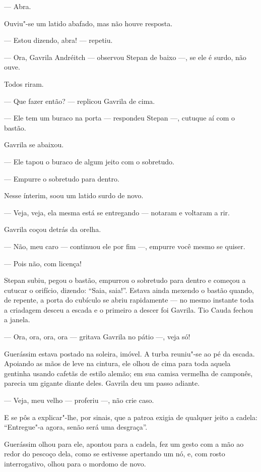 --- Abra.

Ouviu"-se um latido abafado, mas não houve resposta.

--- Estou dizendo, abra! --- repetiu.

--- Ora, Gavrila Andréitch --- observou Stepan de baixo ---, se ele é
surdo, não ouve.

Todos riram.

--- Que fazer então? --- replicou Gavrila de cima.

--- Ele tem um buraco na porta --- respondeu Stepan ---, cutuque aí com
o bastão.

Gavrila se abaixou.

--- Ele tapou o buraco de algum jeito com o sobretudo.

--- Empurre o sobretudo para dentro.

Nesse ínterim, soou um latido surdo de novo.

--- Veja, veja, ela mesma está se entregando --- notaram e voltaram a
rir.

Gavrila coçou detrás da orelha.

--- Não, meu caro --- continuou ele por fim ---, empurre você mesmo se
quiser.

--- Pois não, com licença!

Stepan subiu, pegou o bastão, empurrou o sobretudo para dentro e começou
a cutucar o orifício, dizendo: ``Saia, saia!''. Estava ainda mexendo o
bastão quando, de repente, a porta do cubículo se abriu rapidamente ---
no mesmo instante toda a criadagem desceu a escada e o primeiro a descer
foi Gavrila. Tio Cauda fechou a janela.

--- Ora, ora, ora, ora --- gritava Gavrila no pátio ---, veja só!

Guerássim estava postado na soleira, imóvel. A turba reuniu"-se ao pé da
escada. Apoiando as mãos de leve na cintura, ele olhou de cima para toda
aquela gentinha usando cafetãs de estilo alemão; em sua camisa vermelha
de camponês, parecia um gigante diante deles. Gavrila deu um passo
adiante.

--- Veja, meu velho --- proferiu ---, não crie caso.

E se pôs a explicar"-lhe, por sinais, que a patroa exigia de qualquer
jeito a cadela: ``Entregue"-a agora, senão será uma desgraça''.

Guerássim olhou para ele, apontou para a cadela, fez um gesto com a mão
ao redor do pescoço dela, como se estivesse apertando um nó, e, com
rosto interrogativo, olhou para o mordomo de novo.

